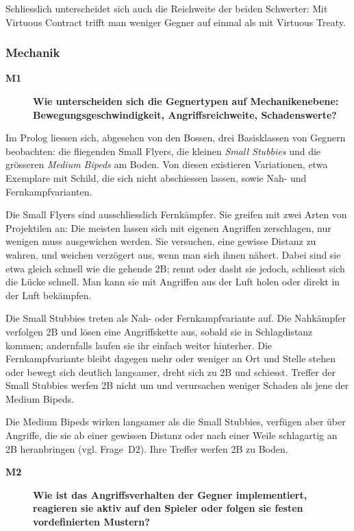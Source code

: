 \documentclass[../Main.tex]{subfiles}
\begin{document}
Schliesslich unterscheidet sich auch die Reichweite der beiden Schwerter: Mit Virtuous Contract trifft man weniger Gegner auf einmal als mit Virtuous Treaty.\endgroup

\subsubsection{Mechanik}

\begin{description}
    \item[\textbf{M1}] \textbf{Wie unterscheiden sich die Gegnertypen auf Mechanikenebene: Bewegungsgeschwindigkeit, Angriffsreichweite, Schadenswerte?}
\end{description}

Im Prolog liessen sich, abgesehen von den Bossen, drei Basisklassen von Gegnern beobachten: die fliegenden Small Flyers, die kleinen \textit{Small Stubbies} und die grösseren \textit{Medium Bipeds} am Boden. Von diesen existieren Variationen, etwa Exemplare mit Schild, die sich nicht abschiessen lassen, sowie Nah- und Fernkampfvarianten.

Die Small Flyers sind ausschliesslich Fernkämpfer. Sie greifen mit zwei Arten von Projektilen an: Die meisten lassen sich mit eigenen Angriffen zerschlagen, nur wenigen muss ausgewichen werden. Sie versuchen, eine gewisse Distanz zu wahren, und weichen verzögert aus, wenn man sich ihnen nähert. Dabei sind sie etwa gleich schnell wie die gehende 2B; rennt oder dasht sie jedoch, schliesst sich die Lücke schnell. Man kann sie mit Angriffen aus der Luft holen oder direkt in der Luft bekämpfen.

Die Small Stubbies treten als Nah- oder Fernkampfvariante auf. Die Nahkämpfer verfolgen 2B und lösen eine Angriffskette aus, sobald sie in Schlagdistanz kommen; andernfalls laufen sie ihr einfach weiter hinterher. Die Fernkampfvariante bleibt dagegen mehr oder weniger an Ort und Stelle stehen oder bewegt sich deutlich langsamer, dreht sich zu 2B und schiesst. Treffer der Small Stubbies werfen 2B nicht um und verursachen weniger Schaden als jene der Medium Bipeds.

Die Medium Bipeds wirken langsamer als die Small Stubbies, verfügen aber über Angriffe, die sie ab einer gewissen Distanz oder nach einer Weile schlagartig an 2B heranbringen (vgl. Frage~D2). Ihre Treffer werfen 2B zu Boden.

\begin{description}
    \item[\textbf{M2}] \textbf{Wie ist das Angriffsverhalten der Gegner implementiert, reagieren sie aktiv auf den Spieler oder folgen sie festen vordefinierten Mustern?}
\end{description}
\end{document}
